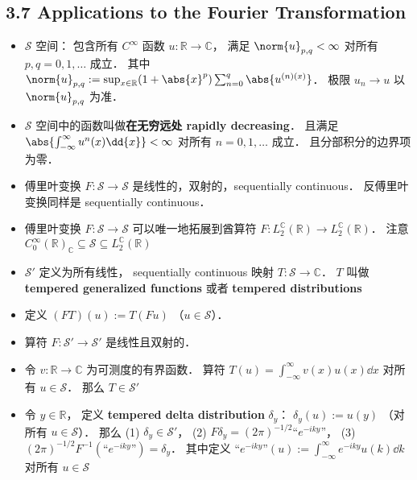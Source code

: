 \subsection{3.7 Applications to the Fourier Transformation}
\begin{itemize}
\item $\mathcal S$ 空间： 包含所有 $C^\infty$ 函数 $u: \mathbb R \to \mathbb C$， 满足 $\norm{u}_{p,q} < \infty$ 对所有 $p, q=0,1,\dots$ 成立． 其中 $\norm{u}_{p,q} := \sup_{x\in\mathbb R} (1+\abs{x}^p) \sum_{n=0}^q\abs{u^{(n)(x)}}$． 极限 $u_n \to u$ 以 $\norm{u}_{p,q}$ 为准．

\item $\mathcal S$ 空间中的函数叫做\textbf{在无穷远处 rapidly decreasing}． 且满足 $\abs{\int_{-\infty}^\infty u^{n}(x) \dd{x}} < \infty$ 对所有 $n = 0, 1,\dots$ 成立． 且分部积分的边界项为零．

\item 傅里叶变换 $F:\mathcal S\to\mathcal S$ 是线性的，双射的，sequentially continuous． 反傅里叶变换同样是 sequentially continuous．

\item 傅里叶变换 $F:\mathcal S\to\mathcal S$ 可以唯一地拓展到酋算符 $F: L_2^{\mathbb C}(\mathbb R) \to L_2^{\mathbb C}(\mathbb R)$． 注意 $C_0^\infty(\mathbb R)_{\mathbb C} \subseteq \mathcal S \subseteq L_2^{\mathbb C}(\mathbb R)$

\item $\mathcal S'$ 定义为所有线性， sequentially continuous 映射 $T: \mathcal S\to \mathbb C$． $T$ 叫做 \textbf{tempered generalized functions} 或者 \textbf{tempered distributions}

\item 定义 $(FT)(u) := T(Fu)$ （$u \in \mathcal S$）．

\item 算符 $F : \mathcal S' \to \mathcal S'$ 是线性且双射的．

\item 令 $v : \mathbb R\to\mathbb C$ 为可测度的有界函数． 算符 $T(u) = \int_{-\infty}^\infty v(x)u(x) \dd{x}$ 对所有 $u \in \mathcal S$． 那么 $T \in \mathcal S'$

\item 令 $y \in \mathbb R$， 定义 \textbf{tempered delta distribution} $\delta_y$： $\delta_y(u) := u(y)$ （对所有 $u \in \mathcal S$）． 那么 (1) $\delta_y \in \mathcal S'$， (2) $F\delta_y = (2\pi)^{-1/2} “e^{-iky}”$， (3) $(2\pi)^{-1/2} F^{-1} (“e^{-iky}”) = \delta_y$． 其中定义 $“e^{-iky}”(u) := \int_{-\infty}^\infty e^{-iky} u(k) \dd{k}$ 对所有 $u\in\mathcal S$
\end{itemize}

